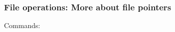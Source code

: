 \documentclass[xcolor=table,10pt,handout]{beamer}
\begin{document}






\begin{frame}[fragile]
  \frametitle{File operations: More about file pointers}
  Commands:

  \begin{description}[leftmargin=!,labelwidth=\widthof{\bfseries
      tell()00 }]
    \item[tell()] 
    \item[seek()] 
  \end{description}

\end{frame}
\end{document}
